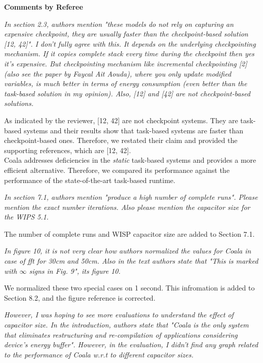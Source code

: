 \documentclass[10pt]{article}
\newcommand{\referee}[1]{
	{\item \color{OliveGreen} \emph{{#1}}}
	\label{R\therefereeCounter:\arabic{enumi}}
}
\newcommand{\response}[1]{{\color{blue} #1}}
\newcounter{refereeCounter}
\newenvironment{responses}{%
\refstepcounter{refereeCounter}%
\textbf{\large Comments by Referee \therefereeCounter}
\begin{enumerate}%
\renewcommand{\labelenumi}{\textbf{[R\therefereeCounter :\,\arabic{enumi}]}} %
}{\end{enumerate}}
\begin{document}
\begin{responses}
	
\referee{In section 2.3, authors mention "these models do not rely on capturing an expensive checkpoint, they are usually faster than the checkpoint-based solution [12, 42]". I don't fully agree with this. It depends on the underlying checkpointing mechanism. If it copies complete stack every time during the checkpoint then yes it's expensive. But checkpointing mechanism like incremental checkpointing [2] (also see the paper by Faycal Ait Aouda), where you only update modified variables, is much better in terms of energy consumption (even better than the task-based solution in my opinion). Also, [12] and [42] are not checkpoint-based solutions.}

\response{As indicated by the reviewer, [12, 42] are not checkpoint systems. They are task-based systems and their results show that task-based systems are faster than checkpoint-based ones. Therefore, we restated their claim and provided the supporting references, which are [12, 42].\\
 Coala addresses deficiencies in the \emph{static} task-based systems and provides a more efficient alternative. Therefore, we compared its performance against the performance of the state-of-the-art task-based runtime.}

\referee{In section 7.1, authors mention "produce a high number of complete runs". Please mention the exact number iterations. Also please mention the capacitor size for the WIPS 5.1.}

\response{The number of complete runs and WISP capacitor size are added to Section 7.1.}

\referee{In figure 10, it is not very clear how authors normalized the values for Coala in case of fft for 30cm and 50cm. Also in the text authors state that "This is marked with $\infty$ signs in Fig. 9", its figure 10. }	

\response{We normalized these two special cases on 1 second. This infromation is added to Section 8.2, and the figure reference is corrected. }

\referee{However, I was hoping to see more evaluations to understand the effect of capacitor size. In the introduction, authors state that "Coala is the only system that eliminates restructuring and re-compilation of applications considering device’s energy buffer". However, in the evaluation, I didn't find any graph related to the performance of Coala w.r.t to different capacitor sizes.}


\end{responses}
\end{document}
